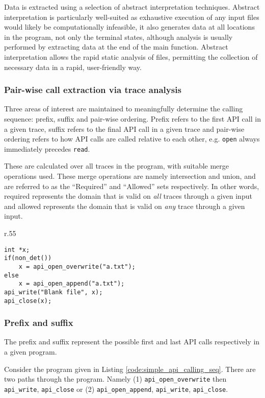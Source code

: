 \documentclass[EPiC]{easychair}
\begin{document}
Data is extracted using a selection of abstract interpretation techniques.  Abstract interpretation is particularly well-suited as exhaustive execution of any input files would likely be computationally infeasible, it also generates data at all locations in the program, not only the terminal states, although analysis is usually performed by extracting data at the end of the main function. Abstract interpretation allows the rapid static analysis of files, permitting the collection of necessary data in a rapid, user-friendly way.

\subsubsection{Pair-wise call extraction via trace analysis}
Three areas of interest are maintained to meaningfully determine the calling sequence:  prefix, suffix and pair-wise ordering.   Prefix refers to the first API call in a given trace, suffix refers to the final API call in a given trace and pair-wise ordering refers to how API calls are called relative to each other, e.g. \texttt{open} always immediately precedes \texttt{read}.  

These are calculated over all traces in the program, with suitable merge operations used.  These merge operations are namely intersection and union, and are referred to as the \enquote{Required} and \enquote{Allowed} sets respectively.  In other words, required represents the domain that is valid on \textit{all} traces through a given input and allowed represents the domain that is valid on \textit{any} trace through a given input.  

\begin{wrapfigure}{r}{.55\textwidth}
\begin{lstlisting}[caption={A simple API calling sequence.}, numbers=none, label={code:simple_api_calling_seq}]
int *x;
if(non_det())
	x = api_open_overwrite("a.txt");
else
	x = api_open_append("a.txt");
api_write("Blank file", x);
api_close(x);
\end{lstlisting}
\end{wrapfigure}


\subsubsection{Prefix and suffix}
The prefix and suffix represent the possible first and last API calls respectively in a given program.

Consider the program given in Listing \ref{code:simple_api_calling_seq}.  There are two paths through the program.  Namely (1) \texttt{api\_open\_overwrite} then \texttt{api\_write}, \texttt{api\_close} or (2) \texttt{api\_open\_append}, \texttt{api\_write}, \texttt{api\_close}.
\end{document}
